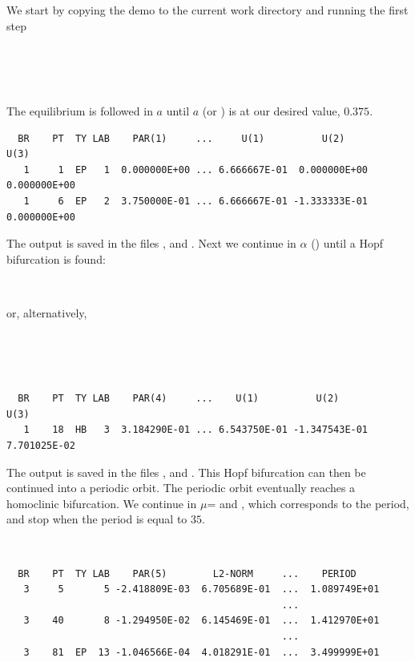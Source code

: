 We start by copying the demo to the current work directory 
and running the first step
\begin{center}
\\
 \\
 \\
\end{center}
The equilibrium is followed in $a$ until $a$ (or ) is at our
desired value, $0.375$.
\begin{verbatim}
  BR    PT  TY LAB    PAR(1)     ...     U(1)          U(2)          U(3)     
   1     1  EP   1  0.000000E+00 ... 6.666667E-01  0.000000E+00  0.000000E+00
   1     6  EP   2  3.750000E-01 ... 6.666667E-01 -1.333333E-01  0.000000E+00
\end{verbatim}
The output is saved in the files ,  and
.
Next we continue in $\alpha$ () until a Hopf bifurcation is
found:
\begin{center}
\\
\end{center}
or, alternatively,
\begin{center}
\\
\\
\\
\end{center}
\begin{verbatim}
  BR    PT  TY LAB    PAR(4)     ...    U(1)          U(2)          U(3)     
   1    18  HB   3  3.184290E-01 ... 6.543750E-01 -1.347543E-01  7.701025E-02
\end{verbatim}
The output is saved in the files ,  and
.
This Hopf bifurcation can then be continued into a periodic orbit. The
periodic orbit eventually reaches a homoclinic bifurcation. We
continue in $\mu$= and , 
which corresponds to the period, and stop when the period is equal to $35$.
\begin{center}
 \\
\end{center}
\begin{verbatim}
  BR    PT  TY LAB    PAR(5)        L2-NORM     ...    PERIOD    
   3     5       5 -2.418809E-03  6.705689E-01  ...  1.089749E+01
                                                ...
   3    40       8 -1.294950E-02  6.145469E-01  ...  1.412970E+01
                                                ...
   3    81  EP  13 -1.046566E-04  4.018291E-01  ...  3.499999E+01
\end{verbatim}
